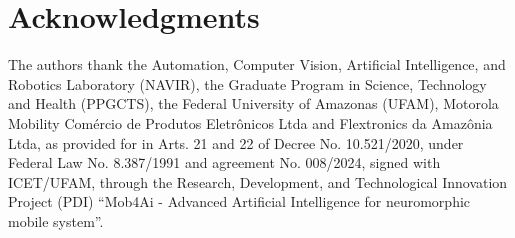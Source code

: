\section*{Acknowledgments}

The authors thank the Automation, Computer Vision, Artificial Intelligence, and Robotics Laboratory (NAVIR), the Graduate Program in Science, Technology and Health (PPGCTS), the Federal University of Amazonas (UFAM), Motorola Mobility Comércio de Produtos Eletrônicos Ltda and Flextronics da Amazônia Ltda, as provided for in Arts. 21 and 22 of Decree No. 10.521/2020, under Federal Law No. 8.387/1991 and agreement No. 008/2024, signed with ICET/UFAM, through the Research, Development, and Technological Innovation Project (PDI) ``Mob4Ai - Advanced Artificial Intelligence for neuromorphic mobile system''.
